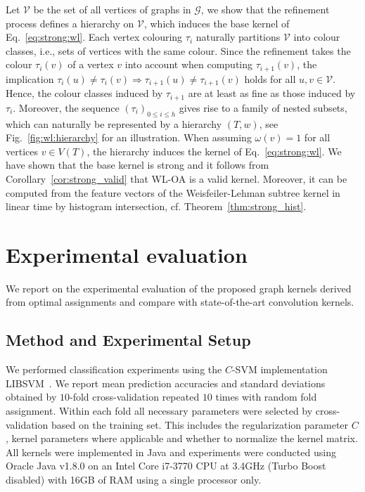 \documentclass{article}
\newcommand{\lab}[0]{\tau}
\newcommand{\V}{\ensuremath{\mathcal{V}}\xspace}
\newcommand{\G}{\ensuremath{\mathcal{G}}\xspace}
\begin{document}
Let \V be the set of all vertices of graphs in \G, we show that the refinement 
process defines a hierarchy on \V, which induces the base kernel of 
Eq.~\eqref{eq:strong:wl}.
Each vertex colouring $\lab_i$ naturally partitions \V into colour classes, 
i.e., sets of vertices with the same colour.
Since the refinement takes the colour $\lab_i(v)$ of a vertex $v$ into account 
when computing $\lab_{i+1}(v)$, the implication 
$\lab_i(u) \neq \lab_i(v) \Rightarrow \lab_{i+1}(u) \neq \lab_{i+1}(v)$ holds
for all $u,v \in \V$. 
Hence, the colour classes induced by $\lab_{i+1}$ are at least as fine as those 
induced by $\lab_{i}$. Moreover, the sequence $(\lab_i)_{0 \leq i \leq h}$ gives 
rise to a family of nested subsets, which can naturally be represented by a
hierarchy $(T,w)$, see Fig.~\ref{fig:wl:hierarchy} for an illustration.
When assuming $\omega(v)=1$ for all vertices $v \in V(T)$, the hierarchy induces
the kernel of Eq.~\eqref{eq:strong:wl}. 
We have shown that the base kernel is strong and it follows from 
Corollary~\ref{cor:strong_valid} that WL-OA is a valid kernel. Moreover,
it can be computed from the feature vectors of the Weisfeiler-Lehman subtree 
kernel in linear time by histogram intersection, cf. Theorem~\ref{thm:strong_hist}.



\section{Experimental evaluation}
We report on the experimental evaluation of the proposed graph kernels derived 
from optimal assignments and compare with state-of-the-art convolution kernels.

\subsection{Method and Experimental Setup}
We performed classification experiments using the $C$-SVM implementation 
LIBSVM~\cite{Chang2011}.
We report mean prediction accuracies and standard deviations obtained by 
$10$-fold cross-validation repeated $10$ times with random fold assignment.
Within each fold all necessary parameters were selected by cross-validation 
based on the training set. This includes the regularization parameter $C$, kernel
parameters where applicable and whether to normalize the kernel matrix.
All kernels were implemented in Java and experiments were conducted using 
Oracle Java v1.8.0 on an Intel Core i7-3770 CPU at 3.4GHz (Turbo Boost disabled)
with 16GB of RAM using a single processor only.
\end{document}
